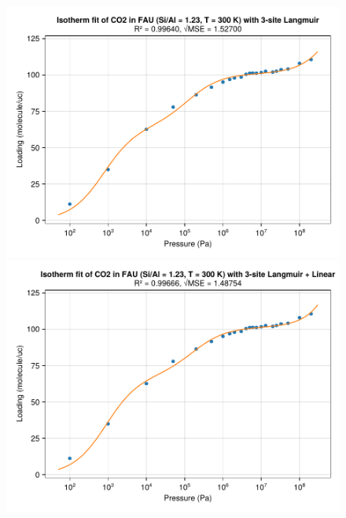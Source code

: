 \documentclass[main.tex]{subfiles}
\begin{document}
\begin{figure}\ContinuedFloat
	\begin{minipage}{0.49\columnwidth}
		\includegraphics[width=\columnwidth]{figures/isotherms/3-site Langmuir.pdf}
	\end{minipage}\hfill%
	\begin{minipage}{0.49\columnwidth}
		\includegraphics[width=\columnwidth]{figures/isotherms/3-site Langmuir + Linear.pdf}
	\end{minipage}
	

\end{figure}
\end{document}
